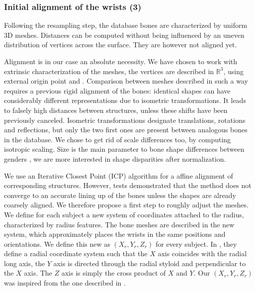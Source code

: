 \subsubsection{Initial alignment of the wrists (3)}
\label{ssubsec:rough_ali}

Following the resampling step, the database bones \md* are characterized by uniform 3D meshes. Distances can be computed without being influenced by an uneven distribution of vertices across the surface. They are however not aligned yet. 

Alignment is in our case an absolute necessity. We have chosen to work with extrinsic characterization of the meshes, the vertices are described in $\mathbb{R}^3$, using external origin point and \soc*. Comparison between meshes described in such a way requires a previous rigid alignment of the bones: identical shapes can have considerably different representations due to isometric transformations. It leads to falsely high distances between structures, unless these shifts have been previously canceled. Isometric transformations designate translations, rotations and reflections, but only the two first ones are present between analogous bones in the database. We chose to get rid of scale differences too, by computing isotropic scaling. Size is the main parameter to bone shape differences between genders \cite{joshi_2016_registration-based}, we are more interested in shape disparities after normalization. 

We use an Iterative Closest Point (ICP) algorithm for a affine alignment of corresponding structures. However, tests demonstrated that the method does not converge to an accurate lining up of the bones unless the shapes are already coarsely aligned. 
We therefore propose a first step to roughly adjust the meshes. We define for each subject a new system of coordinates attached to the radius, characterized by radius features. The bone meshes are described in the new system, which approximately places the wrists in the same positions and orientations. 
We define this new \soc* as $(X_r, Y_r, Z_r)$ for every subject. %
In \cite{coburn_2007_coordinate}, they define a radial coordinate system such that the $X$ axis coincides with the radial long axis, the $Y$ axis is directed through the radial styloid and perpendicular to the $X$ axis. The $Z$ axis is simply the cross product of $X$ and $Y$. Our \soc* $(X_r, Y_r, Z_r)$ was inspired from the one described in \cite{coburn_2007_coordinate}. 


